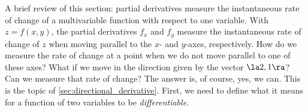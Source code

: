 A brief review of this section: partial derivatives measure the instantaneous rate of change of a multivariable function with respect to one variable. %
With $z=f(x,y)$, the partial derivatives $f_x$ and $f_y$ measure the instantaneous rate of change of $z$ when moving parallel to the $x$- and $y$-axes, respectively. How do we measure the rate of change at a point when we do not move parallel to one of these axes? What if we move in the direction given by the vector $\la 2,1\ra$? Can we measure that rate of change? The answer is, of course, yes, we can. This is the topic of \autoref{sec:directional_derivative}. First, we need to define what it means for a function of two variables to be \textit{differentiable.}

